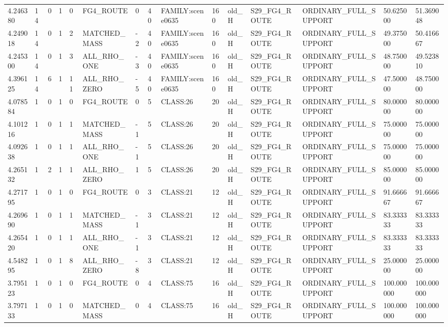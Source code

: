 \begin{tabular}{lllllllllllllll}
4.246380 & 14 & 0 & 1 & 0 & FG4\_ROUTE & 0 & 40 & FAMILY:scene0635 & 160 & old\_H & S29\_FG4\_ROUTE & ORDINARY\_FULL\_SUPPORT & 50.625000 & 51.369048 \\
4.249018 & 14 & 0 & 1 & 2 & MATCHED\_MASS & -2 & 40 & FAMILY:scene0635 & 160 & old\_H & S29\_FG4\_ROUTE & ORDINARY\_FULL\_SUPPORT & 49.375000 & 50.416667 \\
4.245300 & 14 & 0 & 1 & 3 & ALL\_RHO\_ONE & -3 & 40 & FAMILY:scene0635 & 160 & old\_H & S29\_FG4\_ROUTE & ORDINARY\_FULL\_SUPPORT & 48.750000 & 49.523810 \\
4.396125 & 14 & 6 & 1 & 11 & ALL\_RHO\_ZERO & -5 & 40 & FAMILY:scene0635 & 160 & old\_H & S29\_FG4\_ROUTE & ORDINARY\_FULL\_SUPPORT & 47.500000 & 48.750000 \\
4.078584 & 1 & 0 & 1 & 0 & FG4\_ROUTE & 0 & 5 & CLASS:26 & 20 & old\_H & S29\_FG4\_ROUTE & ORDINARY\_FULL\_SUPPORT & 80.000000 & 80.000000 \\
4.101216 & 1 & 0 & 1 & 1 & MATCHED\_MASS & -1 & 5 & CLASS:26 & 20 & old\_H & S29\_FG4\_ROUTE & ORDINARY\_FULL\_SUPPORT & 75.000000 & 75.000000 \\
4.092638 & 1 & 0 & 1 & 1 & ALL\_RHO\_ONE & -1 & 5 & CLASS:26 & 20 & old\_H & S29\_FG4\_ROUTE & ORDINARY\_FULL\_SUPPORT & 75.000000 & 75.000000 \\
4.265132 & 1 & 2 & 1 & 1 & ALL\_RHO\_ZERO & 1 & 5 & CLASS:26 & 20 & old\_H & S29\_FG4\_ROUTE & ORDINARY\_FULL\_SUPPORT & 85.000000 & 85.000000 \\
4.271795 & 1 & 0 & 1 & 0 & FG4\_ROUTE & 0 & 3 & CLASS:21 & 12 & old\_H & S29\_FG4\_ROUTE & ORDINARY\_FULL\_SUPPORT & 91.666667 & 91.666667 \\
4.269690 & 1 & 0 & 1 & 1 & MATCHED\_MASS & -1 & 3 & CLASS:21 & 12 & old\_H & S29\_FG4\_ROUTE & ORDINARY\_FULL\_SUPPORT & 83.333333 & 83.333333 \\
4.265420 & 1 & 0 & 1 & 1 & ALL\_RHO\_ONE & -1 & 3 & CLASS:21 & 12 & old\_H & S29\_FG4\_ROUTE & ORDINARY\_FULL\_SUPPORT & 83.333333 & 83.333333 \\
4.548295 & 1 & 0 & 1 & 8 & ALL\_RHO\_ZERO & -8 & 3 & CLASS:21 & 12 & old\_H & S29\_FG4\_ROUTE & ORDINARY\_FULL\_SUPPORT & 25.000000 & 25.000000 \\
3.795123 & 1 & 0 & 1 & 0 & FG4\_ROUTE & 0 & 4 & CLASS:75 & 16 & old\_H & S29\_FG4\_ROUTE & ORDINARY\_FULL\_SUPPORT & 100.000000 & 100.000000 \\
3.797133 & 1 & 0 & 1 & 0 & MATCHED\_MASS & 0 & 4 & CLASS:75 & 16 & old\_H & S29\_FG4\_ROUTE & ORDINARY\_FULL\_SUPPORT & 100.000000 & 100.000000 \\

\end{tabular}
